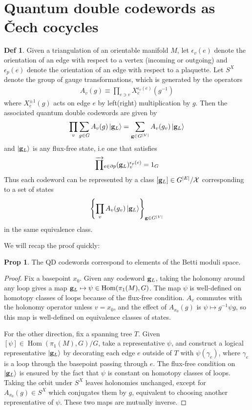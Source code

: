 \documentclass[11pt]{article}
\theoremstyle{definition}
\newtheorem{defn}{Def}
\newtheorem{prop}{Prop}
\newcommand{\Hom}{\operatorname{Hom}}
\begin{document}
\section{Quantum double codewords as \v{C}ech cocycles}

\begin{defn}
Given a triangulation of an orientable manifold $M$, let $\epsilon_v(e)$ denote
the orientation of an edge with respect to a vertex (incoming or outgoing) and
$\epsilon_p(e)$ denote the orientation of an edge with respect to a
plaquette. Let $S^X$ denote the group of gauge transformations, which is
generated by the operators
\begin{align}
  A_v(g) \equiv \prod_{e \ni v}X_e^{\epsilon_v(e)}(g^{-1})
\end{align}
where $X_e^{\pm 1}(g)$ acts on edge $e$ by left(right) multiplication by $g$.
Then the associated quantum double codewords are given by
\begin{align}
\prod_v \sum_{g \in G}A_v(g)\ket{\vb g_L} = \sum_{\vb g \in G^{|V|}}A_v(g_v)\ket{\vb g_L}
\end{align}
and $\ket{\vb g_L}$ is any flux-free state, i.e one that satisfies
\begin{align}
\overrightarrow\prod_{e \in \partial p} (\vb g_L)_v^{\epsilon_{p}(e)} = 1_G
\end{align}
Thus each codeword can be represented by a class $[\vb g_L] \in
G^{|E|}/\mathcal X$ corresponding to a set of states
\begin{align}
\left\{\prod_vA_v(g_v)\ket{\vb g_L}\right\}_{\vb g \in G^{|V|}}
\end{align}
in the same equivalence class.
\end{defn}

We will recap the proof quickly:
\begin{prop}
  The QD codewords correspond to elements of the Betti moduli space.
\end{prop}

\begin{proof}
  Fix a basepoint $x_0$. Given any codeword $\vb g_L$, taking the holonomy
  around any loop gives a map $\vb g_L \mapsto \psi \in \Hom(\pi_1(M), G)$. The
  map $\psi$ is well-defined on homotopy classes of loops because of the
  flux-free condition. $A_{v}$ commutes with the holonomy operator unless
  $v = x_0$, and the effect of $A_{x_0}(g)$ is $\psi \mapsto g^{-1}\psi g$, so this
  map is well-defined on equivalence classes of states.

  For the other direction, fix a spanning tree $T$. Given $[\psi] \in
    \Hom(\pi_1(M), G)/G$, take a representative $\psi$, and construct a logical representative $\ket{\vb g_L}$ by decorating each
   edge $e$ outside of $T$ with $\psi(\gamma_e)$, where $\gamma_e$ is a loop through
  the basepoint passing through $e$. The flux-free condition on $\ket{\vb g_L}$
  is ensured by the fact that $\psi$ is constant on homotopy
  classes of loops. Taking
  the orbit under $S^X$ leaves holonomies unchanged, except for $A_{x_0}(g) \in
  S^X$ which conjugates them by $g$, equivalent to choosing another
  representative of $\psi$. These two maps are mutually inverse.
\end{proof}
\end{document}
